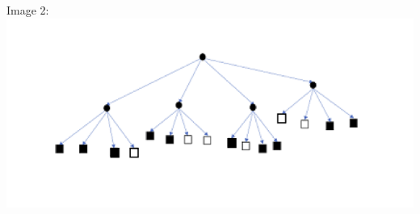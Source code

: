 \begin{Exercice}[10 minutes]
\begin{solution}
Image 2: \\
    \includegraphics[]{Quad-Tree2Solution.PNG}\\\\
\end{solution}
\end{Exercice}


